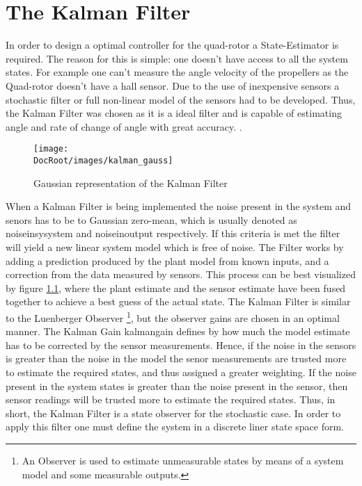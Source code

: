 \chapter{The Kalman Filter}

In order to design a optimal controller for the quad-rotor a State-Estimator is required. The reason for this is simple: one doesn't have access to all the system states. For example one can't measure the angle velocity of the propellers as the Quad-rotor doesn't have a hall sensor. Due to the use of inexpensive sensors a  stochastic filter or full non-linear model of the sensors had to be developed. Thus, the Kalman Filter was chosen as it is a ideal filter and is capable of estimating angle and rate of change of angle with great accuracy.  \cite{acclerometer_bais}.

\begin{figure}[h]
	\centering
	\texttt{[image: \\DocRoot/images/kalman\_gauss]}
	\caption{Gaussian representation of the Kalman Filter}
	\label{Fig: Kalman Filter gauss}
\end{figure}

When a Kalman Filter is being implemented the noise present in the system and senors has to be to Gaussian zero-mean, which is usually denoted as \gls{noiseinsysystem} and \gls{noiseinoutput} respectively. If this criteria is met the filter will yield a new linear system model which is free of noise. The Filter works by adding a prediction produced by the plant model from known inputs, and a correction from the data measured by sensors. This process can be best visualized by figure \ref{Fig: Kalman Filter gauss}, where the plant estimate and the sensor estimate have been fused together to achieve a best guess of the actual state. The Kalman Filter is similar to the Luenberger Observer \footnote{An Observer is used to estimate unmeasurable states by means of a system model and some measurable outputs.}, but the observer gains are chosen in an optimal manner. The Kalman Gain \gls{kalmangain} defines by how much the model estimate has to be corrected by the sensor measurements. Hence, if the noise in the sensors is greater than the noise in the model the senor measurements are trusted more to estimate the required states, and thus assigned a greater weighting. If the noise present in the system states is greater than the noise present in the sensor, then sensor readings will be trusted more to estimate the required states. Thus, in short, the Kalman Filter is a state observer for the stochastic case. In order to apply this filter one must define the system in a discrete liner state space form.

